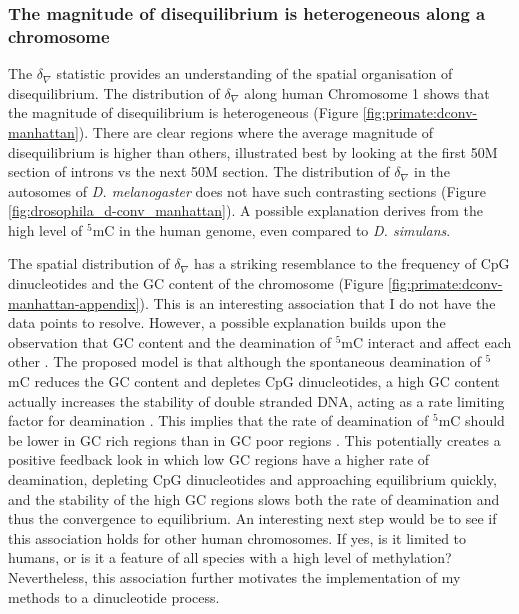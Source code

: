 \subsubsection{The magnitude of disequilibrium is heterogeneous along a chromosome }

The $\delta_\nabla$ statistic provides an understanding of the spatial organisation of disequilibrium. The distribution of $\delta_\nabla$ along human Chromosome 1 shows that the magnitude of disequilibrium is heterogeneous (Figure \ref{fig:primate:dconv-manhattan}). There are clear regions where the average magnitude of disequilibrium is higher than others, illustrated best by looking at the first 50M section of introns vs the next 50M section. The distribution of $\delta_\nabla$ in the autosomes of \textit{D. melanogaster} does not have such contrasting sections (Figure \ref{fig:drosophila_d-conv_manhattan}). A possible explanation derives from the high level of $^5$mC in the human genome, even compared to \textit{D. simulans}. 

The spatial distribution of $\delta_\nabla$ has a striking resemblance to the frequency of CpG dinucleotides and the GC content of the chromosome (Figure \ref{fig:primate:dconv-manhattan-appendix}). This is an interesting association that I do not have the data points to resolve. However, a possible explanation builds upon the observation that GC content and the deamination of $^5$mC interact and affect each other \citep{Fryxell2000CytosineIsochores, Mugal2015EvolutionaryGenomes}. The proposed model is that although the spontaneous deamination of $^5$mC reduces the GC content and depletes CpG dinucleotides,  a high GC content actually increases the stability of double stranded DNA, acting as a rate limiting factor for deamination \citep{Mugal2015EvolutionaryGenomes}. This implies that the rate of deamination of $^5$mC should be lower in GC rich regions than in GC poor regions \citep{Mugal2015EvolutionaryGenomes}. This potentially creates a positive feedback look in which low GC regions have a higher rate of deamination, depleting CpG dinucleotides and approaching equilibrium quickly, and the stability of the high GC regions slows both the rate of deamination and thus the convergence to equilibrium. An interesting next step would be to see if this association holds for other human chromosomes. If yes, is it limited to humans, or is it a feature of all species with a high level of methylation? Nevertheless, this association further motivates the implementation of my methods to a dinucleotide process. 

